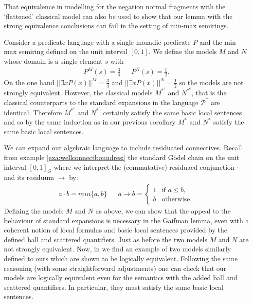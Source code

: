 \documentclass{lmcs} %
\newcommand{\?}{\ensuremath{\mkern0.4\thinmuskip}}
\newcommand{\CP}{\mathcal{P}}
\begin{document}
That equivalence in modelling for the negation normal fragments with the `flattened' classical model can also be used to show that our lemma with the strong equivalence conclusions can fail in the setting of min-max semirings.
\begin{exa}\label{exa:Gaiflem}
    Consider a predicate language with a single monadic predicate $P$ and the min-max semiring defined on the unit interval $[0,1]$. We define the models $M$ and $N$ whose domain is a single element $s$ with\begin{align*}
        P^M(s)=\frac{3}{4} && P^N(s)=\frac{1}{2}.
    \end{align*}
    On the one hand $||\exists xP(x)||^M=\frac{3}{4}$ and $||\exists xP(x)||^N=\frac{1}{2}$ so the models are not strongly equivalent. However, the classical models $M^{\ast^c}$ and $N^{\ast^c}$, that is the classical counterparts to the standard expansions in the language $\CP^\ast$ are identical. Therefore $M^{\ast^c}$ and $N^{\ast^c}$ certainly satisfy the same basic local sentences and so by the same induction as in our previous corollary $M^\ast$ and $N^\ast$ satisfy the same basic local sentences. 

    We can expand our algebraic language to include residuated connectives. Recall from example \ref{exa:wellconnectboundresi} the standard G\"{o}del chain on the unit interval $[0,1]_G$ where we interpret the (commutative) residuaed conjunction $\cdot$ and its residuum $\rightarrow$ by: \begin{align*}
        a\cdot b=min\{a,b\} && a\rightarrow b=\begin{cases}
            1 & \text{if }a\leq b,\\
            b & \text{otherwise}.
        \end{cases}
    \end{align*}
    Defining the models $M$ and $N$ as above, we can show that the appeal to the behaviour of standard expansions is necessary in the Gaifman lemma, even with a coherent notion of local formulas and basic local sentences provided by the defined ball and scattered quantifiers. Just as before the two models $M$ and $N$ are not strongly equivalent. Now, in \cite[Lemma 11, Example 12]{DellundeGarciaNoguera18:Fuzzybackandforth} we find an example of two models similarly defined to ours which are shown to be logically equivalent. Following the same reasoning (with some straightforward adjustments) one can check that our models are logically equivalent even for the semantics with the added ball and scattered quantifiers. In particular, they must satisfy the same basic local sentences.  
\end{exa}
\end{document}
